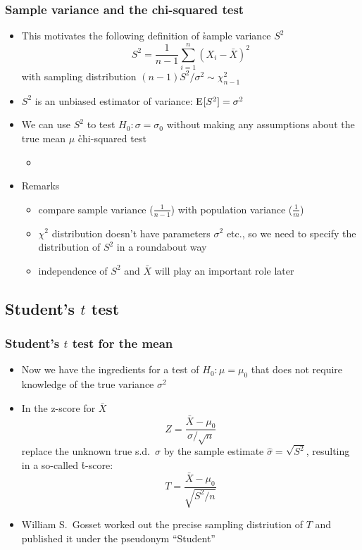 \documentclass[t]{beamer} %
\begin{document}
\begin{frame}
  \frametitle{Sample variance and the chi-squared test}

  \begin{itemize}
  \item This motivates the following definition of \h{sample variance} $S^2$
    \[
    S^2 = \frac{1}{n-1} \sum_{i=1}^n (X_i - \bar{X})^2
    \]
    with sampling distribution $(n-1) S^2 / \sigma^2 \sim \chi^2_{n-1}$
  \item $S^2$ is an unbiased estimator of variance: $\mathrm{E}_{}[S^2] = \sigma^2$
  \item We can use $S^2$ to test $H_0: \sigma = \sigma_0$ without making any
    assumptions about the true mean $\mu$ \so \h{chi-squared test}
    \begin{itemize}
    \item[]
    \end{itemize}
  \item Remarks
    \begin{itemize}
    \item compare sample variance ($\frac{1}{n-1}$) with population variance ($\frac{1}{m}$)
    \item $\chi^2$ distribution doesn't have parameters $\sigma^2$ etc., so we
      need to specify the distribution of $S^2$ in a roundabout way
    \item independence of $S^2$ and $\bar{X}$ will play an important role later
    \end{itemize}
  \end{itemize}
\end{frame}

\subsection{Student's $t$ test}

\begin{frame}
  \frametitle{Student's $t$ test for the mean}

  \begin{itemize}
  \item Now we have the ingredients for a test of $H_0: \mu = \mu_0$ that does
    not require knowledge of the true variance $\sigma^2$
  \item In the z-score for $\bar{X}$
    \[
    Z = \frac{\bar{X} - \mu_0}{\sigma / \sqrt{n}}
    \]
    replace the unknown true s.d.\ $\sigma$ by the sample estimate
    $\hat{\sigma} = \sqrt{S^2}$, resulting in a so-called \h{t-score}:
    \[    
    T = \frac{\bar{X} - \mu_0}{\sqrt{S^2 / n}}
    \]
  \item William S.\ Gosset worked out the precise sampling distriution of
    $T$ and published it under the pseudonym ``Student''
  \end{itemize}
\end{frame}  
\end{document}

